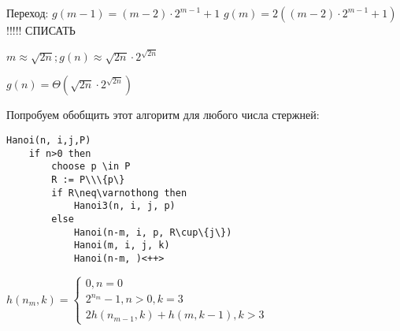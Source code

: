 \documentclass[12pt,a4paper]{article}
\begin{document}
Переход: $g(m-1)=(m-2)\cdot2^{m-1}+1$
$g(m)=2((m-2)\cdot2^{m-1}+1)$ !!!!! СПИСАТЬ

$m\approx\sqrt{2n}; g(n)\approx\sqrt{2n}\cdot2^{\sqrt{2n}}$

$g(n) = \Theta(\sqrt{2n}\cdot2^{\sqrt{2n}})$


Попробуем обобщить этот алгоритм для любого числа стержней:

\begin{lstlisting}
Hanoi(n, i,j,P)
    if n>0 then
        choose p \in P 
        R := P\\\{p\}
        if R\neq\varnothong then
            Hanoi3(n, i, j, p)
        else
            Hanoi(n-m, i, p, R\cup\{j\})
            Hanoi(m, i, j, k)
            Hanoi(n-m, )<++>
\end{lstlisting}

$h(n_m, k) = \begin{cases}
    0, n=0\\
    2^{n_m}-1, n>0, k=3\\
    2h(n_{m-1}, k) + h(m, k-1), k>3
\end{cases}$
\end{document}
